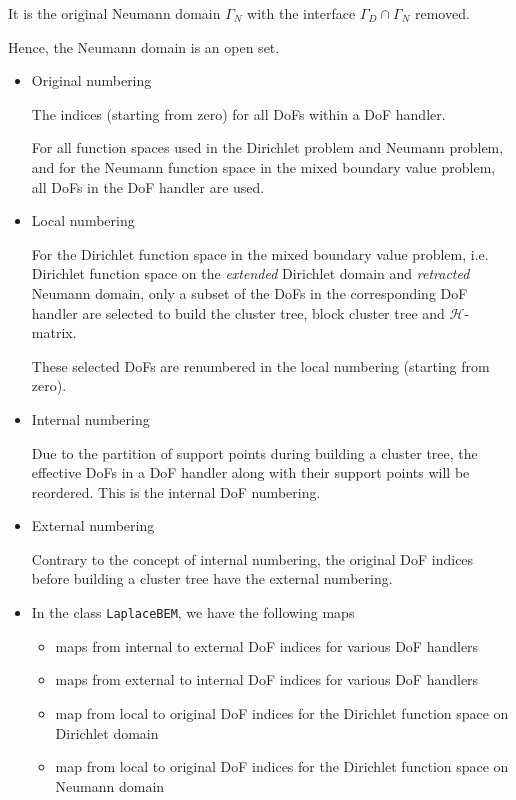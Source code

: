 \documentclass[11pt, a4paper]{book}
\begin{document}
\begin{Definition}
  It is the original Neumann domain $\Gamma_{N}$ with the interface $\Gamma_D\cap\Gamma_N$
  removed.

  Hence, the Neumann domain is an open set.
\end{Definition}

\begin{itemize}
\item Original numbering

  The indices (starting from zero) for all DoFs within a DoF handler.
  
  For all function spaces used in the Dirichlet problem and Neumann problem, and for the
  Neumann function space in the mixed boundary value problem, all DoFs in the DoF handler
  are used.

\item Local numbering

  For the Dirichlet function space in the mixed boundary value problem, i.e. Dirichlet
  function space on the \emph{extended} Dirichlet domain and \emph{retracted} Neumann
  domain, only a subset of the DoFs in the corresponding DoF handler are selected to build
  the cluster tree, block cluster tree and $\mathcal{H}$-matrix.

  These selected DoFs are renumbered in the local numbering (starting from zero).
  
\item Internal numbering

  Due to the partition of support points during building a cluster tree, the effective
  DoFs in a DoF handler along with their support points will be reordered. This is the
  internal DoF numbering.
  
\item External numbering

  Contrary to the concept of internal numbering, the original DoF indices before building
  a cluster tree have the external numbering.

\item In the class \texttt{LaplaceBEM}, we have the following maps
  \begin{itemize}
  \item maps from internal to external DoF indices for various DoF handlers
  \item maps from external to internal DoF indices for various DoF handlers
  \item map from local to original DoF indices for the Dirichlet function space on Dirichlet domain
  \item map from local to original DoF indices for the Dirichlet function space on Neumann domain
  \end{itemize}
\end{itemize}
\end{document}
